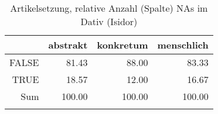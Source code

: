 \begin{table}[ht]
\centering
\begin{tabular}{rrrr}
  \lsptoprule
 & abstrakt & konkretum & menschlich \\ 
  \midrule
FALSE & 81.43 & 88.00 & 83.33 \\ 
  TRUE & 18.57 & 12.00 & 16.67 \\ 
  Sum & 100.00 & 100.00 & 100.00 \\ 
   \lspbottomrule
\end{tabular}
\caption{Artikelsetzung, relative Anzahl (Spalte) NAs im Dativ (Isidor)} 
\end{table}
